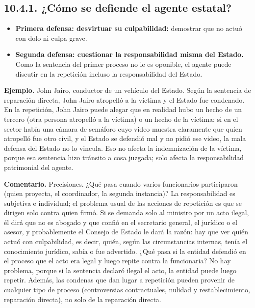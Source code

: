 \subsection{10.4.1. ¿Cómo se defiende el agente estatal?}
\begin{itemize}
\item \textbf{Primera defensa: desvirtuar su culpabilidad:} demostrar que no actuó con dolo ni culpa grave.
\item \textbf{Segunda defensa: cuestionar la responsabilidad misma del Estado.} Como la sentencia del primer proceso no le es oponible, el agente puede discutir en la repetición incluso la responsabilidad del Estado.
\end{itemize}
\begin{ejemplo}
\textcolor[HTML]{4F6228}{\textbf{Ejemplo. }}John Jairo, conductor de un vehículo del Estado. Según la sentencia de reparación directa, John Jairo atropelló a la víctima y el Estado fue condenado. En la repetición, John Jairo puede alegar que en realidad hubo un hecho de un tercero (otra persona atropelló a la víctima) o un hecho de la víctima: si en el sector había una cámara de semáforo cuyo video muestra claramente que quien atropelló fue otro civil, y el Estado se defendió mal y no pidió ese video, la mala defensa del Estado no lo vincula. Eso no afecta la indemnización de la víctima, porque esa sentencia hizo tránsito a cosa juzgada; solo afecta la responsabilidad patrimonial del agente.
\end{ejemplo}
\begin{comentario}
\textcolor[HTML]{8A6D3B}{\textbf{Comentario. }}Precisiones. ¿Qué pasa cuando varios funcionarios participaron (quien proyecta, el coordinador, la segunda instancia)? La responsabilidad es subjetiva e individual; el problema usual de las acciones de repetición es que se dirigen solo contra quien firmó. Si se demanda solo al ministro por un acto ilegal, él dirá que no es abogado y que confió en el secretario general, el jurídico o el asesor, y probablemente el Consejo de Estado le dará la razón: hay que ver quién actuó con culpabilidad, es decir, quién, según las circunstancias internas, tenía el conocimiento jurídico, sabía o fue advertido. ¿Qué pasa si la entidad defendió en el proceso que el acto era legal y luego repite contra la funcionaria? No hay problema, porque si la sentencia declaró ilegal el acto, la entidad puede luego repetir. Además, las condenas que dan lugar a repetición pueden provenir de cualquier tipo de proceso (controversias contractuales, nulidad y restablecimiento, reparación directa), no solo de la reparación directa.
\end{comentario}
